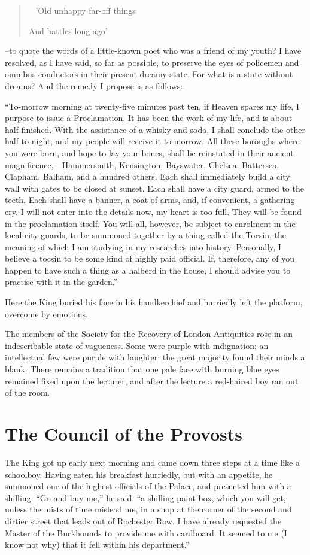 \documentclass{book}
\newenvironment{mdblockquote}{%
  \begin{quotation}
    \
}{%
  \end{quotation}
}
\begin{document}
\begin{mdblockquote}
	’Old unhappy far-off things

	And battles long ago’


\end{mdblockquote}
–to quote the words of a little-known poet who was a friend of my youth? I have resolved, as I have said, so far as possible, to preserve the eyes of policemen and omnibus conductors in their present dreamy state. For what is a state without dreams? And the remedy I propose is as follows:–

“To-morrow morning at twenty-five minutes past ten, if Heaven spares my life, I purpose to issue a Proclamation. It has been the work of my life, and is about half finished. With the assistance of a whisky and soda, I shall conclude the other half to-night, and my people will receive it to-morrow. All these boroughs where you were born, and hope to lay your bones, shall be reinstated in their ancient magnificence,—Hammersmith, Kensington, Bayswater, Chelsea, Battersea, Clapham, Balham, and a hundred others. Each shall immediately build a city wall with gates to be closed at sunset. Each shall have a city guard, armed to the teeth. Each shall have a banner, a coat-of-arms, and, if convenient, a gathering cry. I will not enter into the details now, my heart is too full. They will be found in the proclamation itself. You will all, however, be subject to enrolment in the local city guards, to be summoned together by a thing called the Tocsin, the meaning of which I am studying in my researches into history. Personally, I believe a tocsin to be some kind of highly paid official. If, therefore, any of you happen to have such a thing as a halberd in the house, I should advise you to practise with it in the garden.”

Here the King buried his face in his handkerchief and hurriedly left the platform, overcome by emotions.

The members of the Society for the Recovery of London Antiquities rose in an indescribable state of vagueness. Some were purple with indignation; an intellectual few were purple with laughter; the great majority found their minds a blank. There remains a tradition that one pale face with burning blue eyes remained fixed upon the lecturer, and after the lecture a red-haired boy ran out of the room.

\chapter{The Council of the Provosts}
\label{chapter-6}
The King got up early next morning and came down three steps at a time like a schoolboy. Having eaten his breakfast hurriedly, but with an appetite, he summoned one of the highest officials of the Palace, and presented him with a shilling. “Go and buy me,” he said, “a shilling paint-box, which you will get, unless the mists of time mislead me, in a shop at the corner of the second and dirtier street that leads out of Rochester Row. I have already requested the Master of the Buckhounds to provide me with cardboard. It seemed to me (I know not why) that it fell within his department.”
\end{document}
